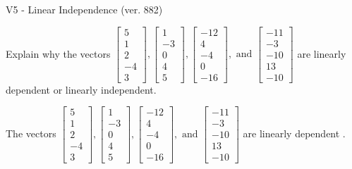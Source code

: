 \begin{exercise}
  \begin{exerciseTitle}V5 - Linear Independence (ver. 882)\end{exerciseTitle}
  \begin{exerciseStatement}
    Explain why the vectors \(\left[\begin{array}{r}
5 \\
1 \\
2 \\
-4 \\
3
\end{array}\right] , \left[\begin{array}{r}
1 \\
-3 \\
0 \\
4 \\
5
\end{array}\right] , \left[\begin{array}{r}
-12 \\
4 \\
-4 \\
0 \\
-16
\end{array}\right] , \text{ and } \left[\begin{array}{r}
-11 \\
-3 \\
-10 \\
13 \\
-10
\end{array}\right]\) are linearly dependent or linearly independent.	


  \end{exerciseStatement}
  \begin{exerciseAnswer}
   The vectors \(\left[\begin{array}{r}
5 \\
1 \\
2 \\
-4 \\
3
\end{array}\right] , \left[\begin{array}{r}
1 \\
-3 \\
0 \\
4 \\
5
\end{array}\right] , \left[\begin{array}{r}
-12 \\
4 \\
-4 \\
0 \\
-16
\end{array}\right] , \text{ and } \left[\begin{array}{r}
-11 \\
-3 \\
-10 \\
13 \\
-10
\end{array}\right]\) are 
  	 linearly dependent  .
  


  \end{exerciseAnswer}
\end{exercise}